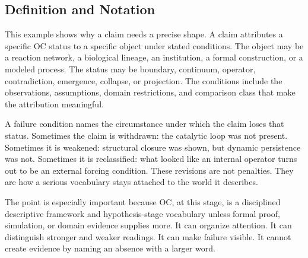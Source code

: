 \documentclass[11pt,a4paper,openany]{book}
\begin{document}
\subsection{Definition and Notation}
This example shows why a claim needs a precise shape. A claim attributes a specific OC status to a specific object under stated conditions. The object may be a reaction network, a biological lineage, an institution, a formal construction, or a modeled process. The status may be boundary, continuum, operator, contradiction, emergence, collapse, or projection. The conditions include the observations, assumptions, domain restrictions, and comparison class that make the attribution meaningful. \cite{haken_synergetics,nicolis_prigogine_selforg}\par
A failure condition names the circumstance under which the claim loses that status. Sometimes the claim is withdrawn: the catalytic loop was not present. Sometimes it is weakened: structural closure was shown, but dynamic persistence was not. Sometimes it is reclassified: what looked like an internal operator turns out to be an external forcing condition. These revisions are not penalties. They are how a serious vocabulary stays attached to the world it describes.\par
The point is especially important because OC, at this stage, is a disciplined descriptive framework and hypothesis-stage vocabulary unless formal proof, simulation, or domain evidence supplies more. It can organize attention. It can distinguish stronger and weaker readings. It can make failure visible. It cannot create evidence by naming an absence with a larger word.\par
\end{document}
